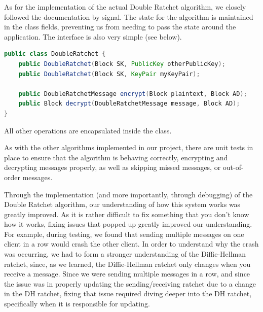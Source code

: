 As for the implementation of the actual Double Ratchet algorithm, we closely followed the documentation by signal.
The state for the algorithm is maintained in the class fields, preventing us from needing to pass the state around the application.
The interface is also very simple (see below).
\begin{lstlisting}[language=Java]
public class DoubleRatchet {
    public DoubleRatchet(Block SK, PublicKey otherPublicKey);
    public DoubleRatchet(Block SK, KeyPair myKeyPair);

    public DoubleRatchetMessage encrypt(Block plaintext, Block AD);
    public Block decrypt(DoubleRatchetMessage message, Block AD);
}
\end{lstlisting}
All other operations are encapsulated inside the class.

As with the other algorithms implemented in our project, there are unit tests 
in place to ensure that the algorithm is behaving correctly, encrypting and decrypting 
messages properly, as well as skipping missed messages, or out-of-order messages.

Through the implementation (and more importantly, through debugging) of the Double Ratchet algorithm, our understanding 
of how this system works was greatly improved. As it is rather difficult to fix something that you don't know how it 
works, fixing issues that popped up greatly improved our understanding. For example, during testing, we found that 
sending multiple messages on one client in a row would crash the other client. In order to understand why the crash was occurring,
we had to form a stronger understanding of the Diffie-Hellman ratchet, since, as we learned, the Diffie-Hellman ratchet only changes 
when you receive a message. Since we were sending multiple messages in a row, and since the issue was in properly updating the 
sending/receiving ratchet due to a change in the DH ratchet, fixing that issue required diving deeper into the DH ratchet, specifically when
it is responsible for updating.
